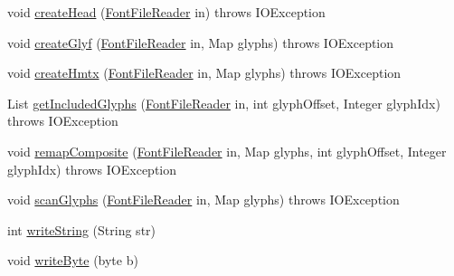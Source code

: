 \begin{DoxyCompactItemize}
\item 
void \mbox{\hyperlink{classorg_1_1newdawn_1_1slick_1_1tools_1_1hiero_1_1truetype_1_1_t_t_f_sub_set_file_a1c8b44f15c900fbafb2fe882f8b5e3dc}{create\+Head}} (\mbox{\hyperlink{classorg_1_1newdawn_1_1slick_1_1tools_1_1hiero_1_1truetype_1_1_font_file_reader}{Font\+File\+Reader}} in)  throws I\+O\+Exception 
\item 
void \mbox{\hyperlink{classorg_1_1newdawn_1_1slick_1_1tools_1_1hiero_1_1truetype_1_1_t_t_f_sub_set_file_a2b576b795892e003c04787ffc1f7262a}{create\+Glyf}} (\mbox{\hyperlink{classorg_1_1newdawn_1_1slick_1_1tools_1_1hiero_1_1truetype_1_1_font_file_reader}{Font\+File\+Reader}} in, Map glyphs)  throws I\+O\+Exception 
\item 
void \mbox{\hyperlink{classorg_1_1newdawn_1_1slick_1_1tools_1_1hiero_1_1truetype_1_1_t_t_f_sub_set_file_acc4a0187159ed3205b6cf9d981f5a64c}{create\+Hmtx}} (\mbox{\hyperlink{classorg_1_1newdawn_1_1slick_1_1tools_1_1hiero_1_1truetype_1_1_font_file_reader}{Font\+File\+Reader}} in, Map glyphs)  throws I\+O\+Exception 
\item 
List \mbox{\hyperlink{classorg_1_1newdawn_1_1slick_1_1tools_1_1hiero_1_1truetype_1_1_t_t_f_sub_set_file_ab464741e727d29adcb652374d2aa4849}{get\+Included\+Glyphs}} (\mbox{\hyperlink{classorg_1_1newdawn_1_1slick_1_1tools_1_1hiero_1_1truetype_1_1_font_file_reader}{Font\+File\+Reader}} in, int glyph\+Offset, Integer glyph\+Idx)  throws I\+O\+Exception 
\item 
void \mbox{\hyperlink{classorg_1_1newdawn_1_1slick_1_1tools_1_1hiero_1_1truetype_1_1_t_t_f_sub_set_file_a1c99664772adc2dea1919d7bc183a352}{remap\+Composite}} (\mbox{\hyperlink{classorg_1_1newdawn_1_1slick_1_1tools_1_1hiero_1_1truetype_1_1_font_file_reader}{Font\+File\+Reader}} in, Map glyphs, int glyph\+Offset, Integer glyph\+Idx)  throws I\+O\+Exception 
\item 
void \mbox{\hyperlink{classorg_1_1newdawn_1_1slick_1_1tools_1_1hiero_1_1truetype_1_1_t_t_f_sub_set_file_ac6b4665aa19603c6718a9153d3bcab5c}{scan\+Glyphs}} (\mbox{\hyperlink{classorg_1_1newdawn_1_1slick_1_1tools_1_1hiero_1_1truetype_1_1_font_file_reader}{Font\+File\+Reader}} in, Map glyphs)  throws I\+O\+Exception 
\item 
int \mbox{\hyperlink{classorg_1_1newdawn_1_1slick_1_1tools_1_1hiero_1_1truetype_1_1_t_t_f_sub_set_file_a2a311e7c3644497626ca47c7c2a0b034}{write\+String}} (String str)
\item 
void \mbox{\hyperlink{classorg_1_1newdawn_1_1slick_1_1tools_1_1hiero_1_1truetype_1_1_t_t_f_sub_set_file_ab27330bb1da2d8ac68f9daa3419139d4}{write\+Byte}} (byte b)

\end{DoxyCompactItemize}
